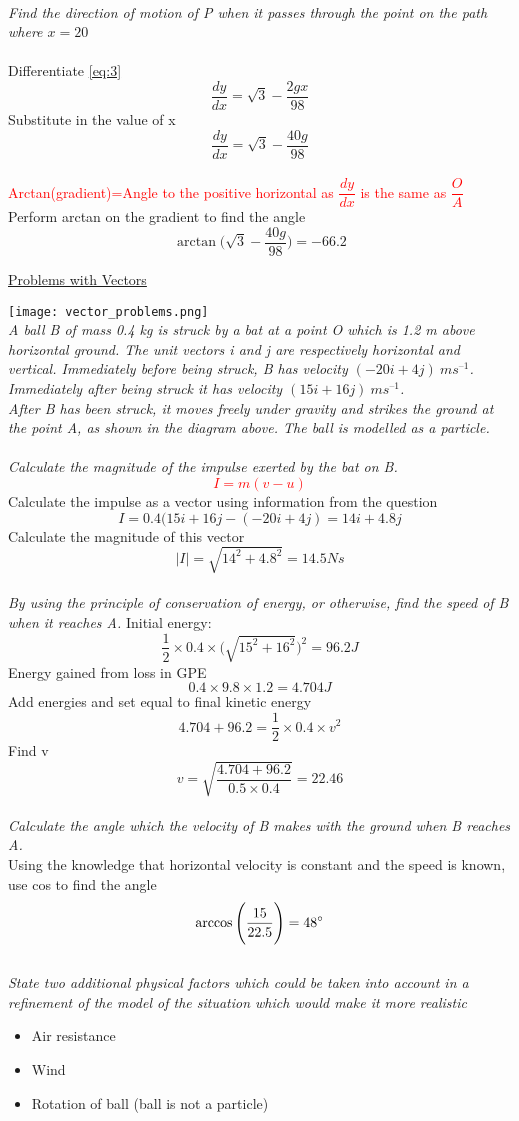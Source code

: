 \documentclass{article}[18pt]
\begin{document}
\\
\textit{Find the direction of motion of P when it passes through the point on the path where $x=20$}\\
\\
Differentiate \eqref{eq:3}
$$\frac{dy}{dx}=\sqrt{3}-\frac{2gx}{98}$$
Substitute in the value of x
$$\frac{dy}{dx}=\sqrt{3}-\frac{40g}{98}$$
\\
\textcolor{red}{Arctan(gradient)=Angle to the positive horizontal as $\dfrac{dy}{dx}$ is the same as $\dfrac{O}{A}$
}
\\
Perform arctan on the gradient to find the angle
$$\arctan\Big(\sqrt{3}-\frac{40g}{98}\Big)=-66.2$$
\newpage
\begin{center}
\underline{\Huge Problems with Vectors}
\end{center}
\texttt{[image: vector\_problems.png]}\\
\textit{A ball B of mass 0.4 kg is struck by a bat at a point O which is 1.2 m above horizontal ground.
The unit vectors i and j are respectively horizontal and vertical. Immediately before being
struck, B has velocity $(-20i+4j) \ ms^{–1}$. Immediately after being struck it has velocity $(15i+
16j) \ ms^{–1}$.\\
After B has been struck, it moves freely under gravity and strikes the ground at the point A, as
shown in the diagram above. The ball is modelled as a particle.}\\
\\
\textit{Calculate the magnitude of the impulse exerted by the bat on B. }
\textcolor{red}{$$I=m(v-u)$$}
Calculate the impulse as a vector using information from the question
$$I=0.4(15i+16j-(-20i+4j)=14i+4.8j$$
Calculate the magnitude of this vector
$$|I|=\sqrt{14^2+4.8^2}=14.5Ns$$
\\
\textit{By using the principle of conservation of energy, or otherwise, find the speed of B when
it reaches A.}
Initial energy:
$$\frac{1}{2}\times0.4\times\Big(\sqrt{15^2+16^2}\Big)^2=96.2J$$
Energy gained from loss in GPE
$$0.4\times9.8\times1.2=4.704J$$
Add energies and set equal to final kinetic energy
$$4.704+96.2=\frac{1}{2}\times0.4\times v^2$$
Find v
$$v=\sqrt{\frac{4.704+96.2}{0.5\times0.4}}=22.46$$
\\
\textit{Calculate the angle which the velocity of B makes with the ground when B reaches A.}\\
Using the knowledge that horizontal velocity is constant and the speed is known, use cos to find the angle
$$\arccos\Bigg(\frac{15}{22.5}\Bigg)=48\degree$$
\\
\textit{State two additional physical factors which could be taken into account in a refinement of
the model of the situation which would make it more realistic}
\begin{itemize}
\item Air resistance
\item Wind
\item Rotation of ball (ball is not a particle)
\end{itemize}
\end{document}
